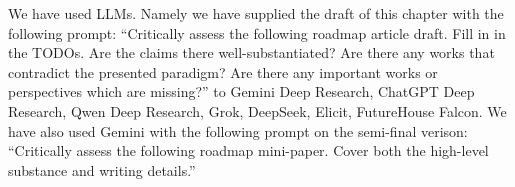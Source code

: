 \documentclass{iopjournal}
\begin{document}
We have used LLMs. Namely we have supplied the draft of this chapter with the following prompt: ``Critically assess the following roadmap article draft. Fill in in the TODOs. Are the claims there well-substantiated? Are there any works that contradict the presented paradigm? Are there any important works or perspectives which are missing?'' to Gemini Deep Research, ChatGPT Deep Research, Qwen Deep Research, Grok, DeepSeek, Elicit, FutureHouse Falcon. We have also used Gemini with the following prompt on the semi-final verison: ``Critically assess the following roadmap mini-paper. Cover both the high-level substance and writing details.''

\printbibliography
\end{document}
